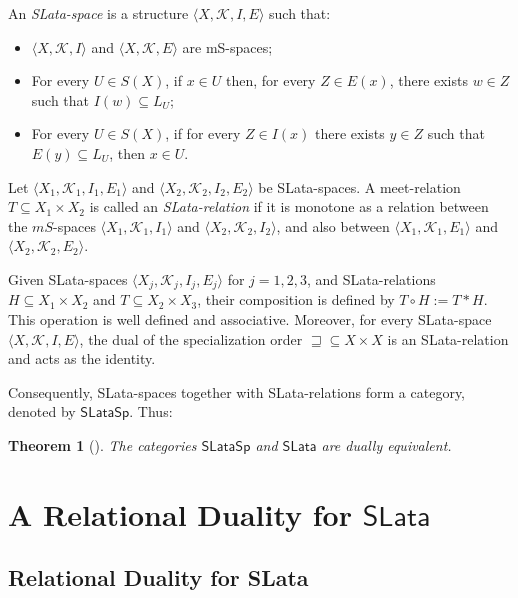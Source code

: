 \documentclass{article}
\newtheorem{theorem}{\bf Theorem}[section]
\begin{document}
\medskip

An \emph{SLata-space} is a structure $\langle X,\mathcal{K},I,E \rangle$ such that:
\begin{itemize}
    \item[(A1)] $\langle X,\mathcal{K},I\rangle$ and $\langle X,\mathcal{K},E\rangle$ are mS-spaces;
    \item[(A2)] For every $U \in S(X)$, if $x \in U$ then, for every $Z \in E(x)$, there exists $w \in Z$ such that $I(w) \subseteq L_U$;
    \item[(A3)] For every $U \in S(X)$, if for every $Z \in I(x)$ there exists $y \in Z$ such that $E(y) \subseteq L_U$, then $x \in U$.
\end{itemize}

\medskip

Let $\langle X_1,\mathcal{K}_1,I_1,E_1\rangle$ and $\langle X_2,\mathcal{K}_2,I_2,E_2\rangle$ be SLata-spaces. A meet-relation $T \subseteq X_1 \times X_2$ is called an \emph{SLata-relation} if it is monotone as a relation between the $mS$-spaces $\langle X_1,\mathcal{K}_1,I_1\rangle$ and $\langle X_2,\mathcal{K}_2,I_2\rangle$, and also between $\langle X_1,\mathcal{K}_1,E_1\rangle$ and $\langle X_2,\mathcal{K}_2,E_2\rangle$.

\medskip

Given SLata-spaces $\langle X_j, \mathcal{K}_j, I_j, E_j\rangle$ for $j=1,2,3$, and SLata-relations $H \subseteq X_1 \times X_2$ and $T \subseteq X_2 \times X_3$, their composition is defined by $T \circ H := T \ast H$. This operation is well defined and associative. Moreover, for every SLata-space $\langle X, \mathcal{K}, I, E \rangle$, the dual of the specialization order $\sqsupseteq \subseteq X \times X$ is an SLata-relation and acts as the identity.

Consequently, SLata-spaces together with SLata-relations form a category, denoted by $\mathsf{SLataSp}$. Thus:

\begin{theorem}[\cite{GPZ}]\label{duality SLata}
    The categories $\mathsf{SLataSp}$ and $\mathsf{SLata}$ are dually equivalent.
\end{theorem}


\section{A Relational Duality for $\mathsf{SLata}$}\label{A Relational Duality for SLata}

\subsection{Relational Duality for SLata}
\end{document}
